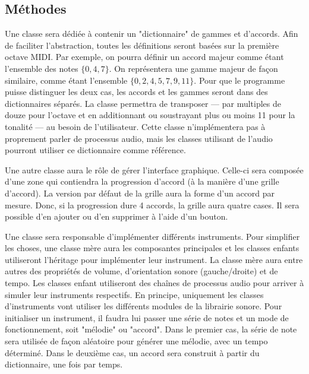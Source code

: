 \documentclass[letterpaper,12pt]{scrartcl}
\begin{document}
	\subsection{Méthodes}
	Une classe sera dédiée à contenir un "dictionnaire" de gammes et d'accords. Afin de faciliter l'abstraction, toutes les définitions seront basées sur la première octave MIDI. Par exemple, on pourra définir un accord majeur comme étant l'ensemble des notes $\{0,4,7\}$. On représentera une gamme majeur de façon similaire, comme étant l'ensemble $\{0,2,4,5,7,9,11\}$. Pour que le programme puisse distinguer les deux cas, les accords et les gammes seront dans des dictionnaires séparés. La classe permettra de transposer --- par multiples de douze pour l'octave et en additionnant ou soustrayant plus ou moins 11 pour la tonalité --- au besoin de l'utilisateur. Cette classe n'implémentera pas à proprement parler de processus audio, mais les classes utilisant de l'audio pourront utiliser ce dictionnaire comme référence. 
	
	Une autre classe aura le rôle de gérer l'interface graphique. Celle-ci sera composée d'une zone qui contiendra la progression d'accord (à la manière d'une grille d'accord). La version par défaut de la grille aura la forme d'un accord par mesure. Donc, si la progression dure 4 accords, la grille aura quatre cases. Il sera possible d'en ajouter ou d'en supprimer à l'aide d'un bouton.
	
	Une classe sera responsable d'implémenter différents instruments. Pour simplifier les choses, une classe mère aura les composantes principales et les classes enfants utiliseront l'héritage pour implémenter leur instrument. La classe mère aura entre autres des propriétés de volume, d'orientation sonore (gauche/droite) et de tempo. Les classes enfant utiliseront des chaînes de processus audio pour arriver à simuler leur instruments respectifs. En principe, uniquement les classes d'instruments vont utiliser les différents modules de la librairie sonore. Pour initialiser un instrument, il faudra lui passer une série de notes et un mode de fonctionnement, soit "mélodie" ou "accord". Dans le premier cas, la série de note sera utilisée de façon aléatoire pour générer une mélodie, avec un tempo déterminé. Dans le deuxième cas, un accord sera construit à partir du dictionnaire, une fois par temps. 
\end{document}
